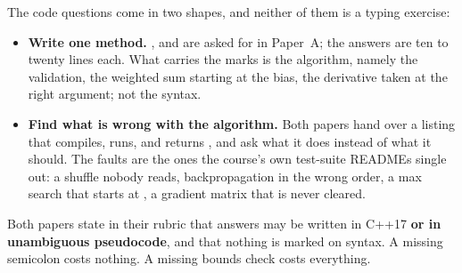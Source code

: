 The code questions come in two shapes, and neither of them is a typing exercise:
\begin{itemize}
  \item \textbf{Write one method.} ,  and
     are asked for in Paper~A; the answers are ten to twenty lines each. What
    carries the marks is the algorithm, namely the validation, the weighted sum starting at the
    bias, the derivative taken at the right argument; not the syntax.
  \item \textbf{Find what is wrong with the algorithm.} Both papers hand over a listing that
    compiles, runs, and returns , and ask what it does instead of what it should. The
    faults are the ones the course's own test-suite READMEs single out: a shuffle nobody reads,
    backpropagation in the wrong order, a max search that starts at , a gradient matrix
    that is never cleared.
\end{itemize}
Both papers state in their rubric that answers may be written in C++17 \textbf{or in unambiguous
pseudocode}, and that nothing is marked on syntax. A missing semicolon costs nothing. A missing
bounds check costs everything.

